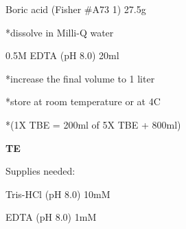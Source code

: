 \documentclass[11pt, oneside]{article}
\begin{document}
			\hspace{2mm}Boric acid	\hspace{3mm}	(Fisher \#A73 1)	\hspace{10mm}	27.5g

			\hspace{2mm}*dissolve in Milli-Q water

			\hspace{2mm}0.5M EDTA (pH 8.0)		\hspace{25mm}			20ml

			\hspace{2mm}*increase the final volume to 1 liter

			\hspace{2mm}*store at room temperature or at 4C

			\hspace{2mm}*(1X TBE = 200ml of 5X TBE + 800ml)

		\vspace{5mm}

		{\bf TE}

			\hspace{2mm}Supplies needed:
		
			\hspace{5mm}Tris-HCl (pH 8.0) 10mM

			\hspace{5mm}EDTA (pH 8.0)	1mM
\end{document}
